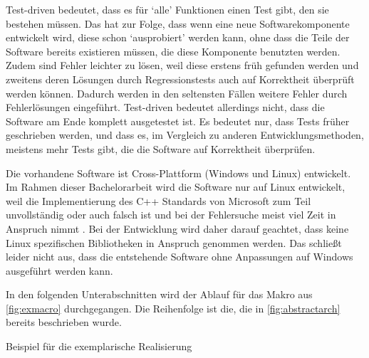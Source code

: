   Test-driven bedeutet, dass es für `alle' Funktionen einen Test gibt, den sie bestehen müssen. Das hat zur Folge, dass wenn eine neue Softwarekomponente entwickelt wird, diese schon `ausprobiert' werden kann, ohne dass die Teile der Software bereits existieren müssen, die diese Komponente benutzten werden. Zudem sind Fehler leichter zu lösen, weil diese erstens früh gefunden werden und zweitens deren Lösungen durch Regressionstests auch auf Korrektheit überprüft werden können. Dadurch werden in den seltensten Fällen weitere Fehler durch Fehlerlösungen eingeführt. Test-driven bedeutet allerdings nicht, dass die Software am Ende komplett ausgetestet ist. Es bedeutet nur, dass Tests früher geschrieben werden, und dass es, im Vergleich zu anderen Entwicklungsmethoden, meistens mehr Tests gibt, die die Software auf Korrektheit überprüfen.

  Die vorhandene Software ist Cross-Plattform (Windows und Linux) entwickelt. Im Rahmen dieser Bachelorarbeit wird die Software nur auf Linux entwickelt, weil die Implementierung des C++ Standards von Microsoft zum Teil unvollständig oder auch falsch ist und bei der Fehlersuche meist viel Zeit in Anspruch nimmt \autocite{new-ms-compiler}. Bei der Entwicklung wird daher darauf geachtet, dass keine Linux spezifischen Bibliotheken in Anspruch genommen werden. Das schließt leider nicht aus, dass die entstehende Software ohne Anpassungen auf Windows ausgeführt werden kann.

  In den folgenden Unterabschnitten wird der Ablauf für das Makro aus \autoref{fig:exmacro} durchgegangen. Die Reihenfolge ist die, die in \autoref{fig:abstractarch} bereits beschrieben wurde.
  \begin{myCodeEnv}
    \centering
    \begin{myInvBox}[width=.9\linewidth]
      
    \end{myInvBox}
    \caption{Beispiel für die exemplarische Realisierung}
    \label{fig:exmacro}
  \end{myCodeEnv}

\newpage

